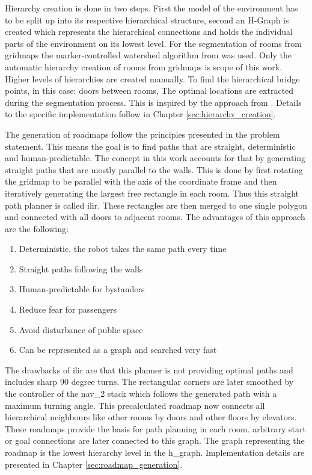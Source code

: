 Hierarchy creation is done in two steps. First the model of the environment has to be split up into its respective hierarchical structure, second an H-Graph is created which represents the hierarchical connections and holds the individual parts of the environment on its lowest level. For the segmentation of rooms from gridmaps the marker-controlled watershed algorithm from \cite{parvati_image_2009} was used. Only the automatic hierarchy creation of rooms from gridmaps is scope of this work. Higher levels of hierarchies are created manually. To find the hierarchical bridge points, in this case: doors between rooms, The optimal locations are extracted during the segmentation process. This is inspired by the approach from \cite{ryu_hierarchical_2020}. Details to the specific implementation follow in Chapter \ref{sec:hierarchy_creation}.

The generation of roadmaps follow the principles presented in the problem statement. This means the goal is to find paths that are straight, deterministic and human-predictable. The concept in this work accounts for that by generating straight paths that are mostly parallel to the walls. This is done by first rotating the gridmap to be parallel with the axis of the coordinate frame and then iteratively generating the largest free rectangle in each room. Thus this straight path planner is called \gls{ilir}. These rectangles are then merged to one single polygon and connected with all doors to adjacent rooms. The advantages of this approach are the following:

\begin{enumerate}
    \item Deterministic, the robot takes the same path every time
    \item Straight paths following the walls
    \item Human-predictable for bystanders
    \item Reduce fear for passengers
    \item Avoid disturbance of public space
    \item Can be represented as a graph and searched very fast
\end{enumerate}

The drawbacks of \gls{ilir} are that this planner is not providing optimal paths and includes sharp 90 degree turns. The rectangular corners are later smoothed by the controller of the \gls{nav_2} stack which follows the generated path with a maximum turning angle. This precalculated roadmap now connects all hierarchical neighbours like other rooms by doors and other floors by elevators. These roadmaps provide the basis for path planning in each room. arbitrary start or goal connections are later connected to this graph. The graph representing the roadmap is the lowest hierarchy level in the \gls{h_graph}. Implementation details are presented in Chapter \ref{sec:roadmap_generation}.

